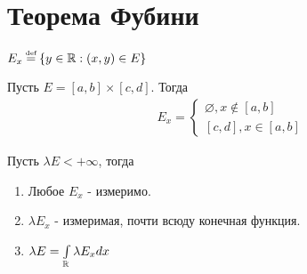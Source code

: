 \section{Теорема Фубини}

\begin{definition}
    $E_x \defeq \set{y \in \mathbb{R} : (x, y) \in E}$
\end{definition}

\begin{example}
    Пусть $E = [a, b] \times [c, d]$. Тогда 
    \begin{gather*}
        E_x = 
        \left\{ \begin{matrix}
                \varnothing, x \notin [a,b] 
                \\ 
                [c, d], x \in [a, b]
        \end{matrix}\right.
    \end{gather*}
\end{example}

\begin{theorem}
    Пусть $\lambda E < +\infty$, тогда
    \begin{enumerate}
        \item 
            Любое $E_x$ - измеримо.
        \item
            $\lambda E_x$ - измеримая, почти всюду конечная функция. 
        \item
            $\lambda E = \int\limits_{\mathbb{R}} \lambda E_x dx$
    \end{enumerate}
\end{theorem}

